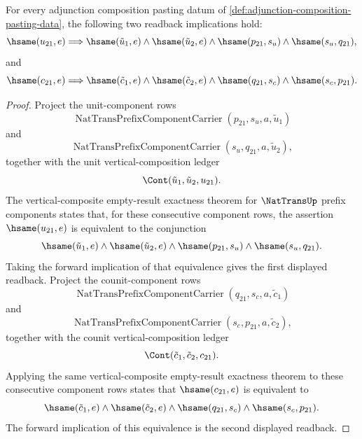 \begin{proposition}
\label{prop:adjunction-composition-empty-readback}
For every adjunction composition pasting datum of \autoref{def:adjunction-composition-pasting-data}, the following two readback implications hold:
$$
\hsame(u_{21},e)\Longrightarrow\hsame(\tilde u_1,e)\wedge\hsame(\tilde u_2,e)\wedge\hsame(p_{21},s_u)\wedge\hsame(s_u,q_{21}),
$$
and
$$
\hsame(c_{21},e)\Longrightarrow\hsame(\tilde c_1,e)\wedge\hsame(\tilde c_2,e)\wedge\hsame(q_{21},s_c)\wedge\hsame(s_c,p_{21}).
$$
\end{proposition}
\begin{proof}
Project the unit-component rows
$$
\operatorname{NatTransPrefixComponentCarrier}(p_{21},s_u,a,\tilde u_1)
$$
and
$$
\operatorname{NatTransPrefixComponentCarrier}(s_u,q_{21},a,\tilde u_2),
$$
together with the unit vertical-composition ledger
$$
\Cont(\tilde u_1,\tilde u_2,u_{21}).
$$
The vertical-composite empty-result exactness theorem for $\NatTransUp$ prefix components states that, for these consecutive component rows, the assertion $\hsame(u_{21},e)$ is equivalent to the conjunction
$$
\hsame(\tilde u_1,e)\wedge\hsame(\tilde u_2,e)\wedge\hsame(p_{21},s_u)\wedge\hsame(s_u,q_{21}).
$$
Taking the forward implication of that equivalence gives the first displayed readback.
Project the counit-component rows
$$
\operatorname{NatTransPrefixComponentCarrier}(q_{21},s_c,a,\tilde c_1)
$$
and
$$
\operatorname{NatTransPrefixComponentCarrier}(s_c,p_{21},a,\tilde c_2),
$$
together with the counit vertical-composition ledger
$$
\Cont(\tilde c_1,\tilde c_2,c_{21}).
$$
Applying the same vertical-composite empty-result exactness theorem to these consecutive component rows states that $\hsame(c_{21},e)$ is equivalent to
$$
\hsame(\tilde c_1,e)\wedge\hsame(\tilde c_2,e)\wedge\hsame(q_{21},s_c)\wedge\hsame(s_c,p_{21}).
$$
The forward implication of this equivalence is the second displayed readback.
\end{proof}

